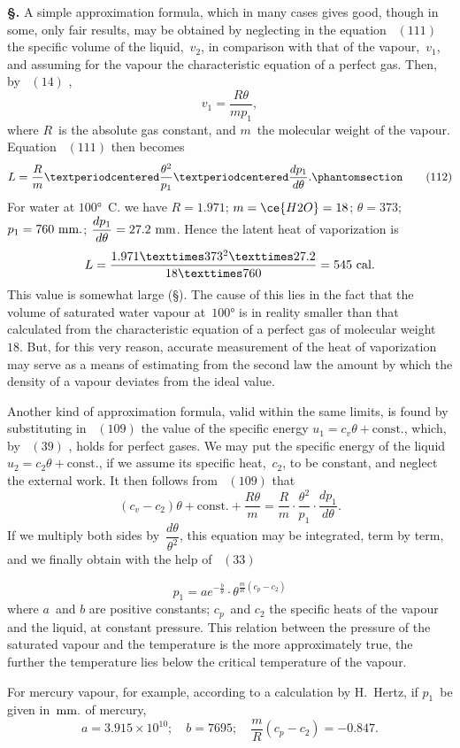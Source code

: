 \documentclass[12pt]{book}[2005/09/16]
\newcommand{\Section}[1]{
  \medskip\par\textbf{§\;#1}
  \label{section:#1}
}
\newcommand{\SecRef}[2][§\;]{\hyperref[section:#2.]{{\upshape #1#2}}}
\newcommand{\Tag}[1]{%
  \phantomsection\label{eqn:#1}\tag*{\ensuremath{#1}}%
}
\newcommand{\Eq}[1]{%
  \hyperref[eqn:#1]{\ensuremath{#1}}%
}
\newcommand{\PageSep}[1]{\ignorespaces}
\newcommand{\const}{\text{const.}}
\newcommand{\efrac}[2]{\tfrac{#1}{#2}}
\newcommand{\Unit}[1]{\text{\upshape #1}}
\begin{document}
\Section{178.} A simple approximation formula, which in many
cases gives good, though in some, only fair results, may be
obtained by neglecting in the equation~\Eq{(111)} the specific
volume of the liquid,~$v_{2}$, in comparison with that of the
vapour,~$v_{1}$, and assuming for the vapour the characteristic
equation of a perfect gas. Then, by~\Eq{(14)},
\[
v_{1} = \frac{R\theta}{mp_{1}},
\]
where $R$~is the absolute gas constant, and $m$~the molecular
weight of the vapour. Equation~\Eq{(111)} then becomes
\[
L = \frac{R}{m} · \frac{\theta^{2}}{p_{1}} · \frac{dp_{1}}{d\theta}.
\Tag{(112)}
\]
For water at $100°$~C. we have $R = 1.971$; $m = \ce{H2O} = 18$;
\PageSep{145}
$\theta = 373$; $p_{1} = 760~\Unit{mm.}$; $\dfrac{dp_{1}}{d\theta} = 27.2~\Unit{mm}$. Hence the
latent heat of vaporization is
\[
L = \frac{1.971 × 373^{2} × 27.2}{18 × 760}
  = 545~\Unit{cal.}
\]
This value is somewhat large (\SecRef{175}). The cause of this
lies in the fact that the volume of saturated water vapour
at~$100°$ is in reality smaller than that calculated from the
characteristic equation of a perfect gas of molecular weight~$18$.
But, for this very reason, accurate measurement of the
heat of vaporization may serve as a means of estimating
from the second law the amount by which the density of a
vapour deviates from the ideal value.

Another kind of approximation formula, valid within the
same limits, is found by substituting in~\Eq{(109)} the value of
the specific energy $u_{1} = c_{v} \theta + \const$, which, by~\Eq{(39)}, holds
for perfect gases. We may put the specific energy of the
liquid $u_{2} = c_{2} \theta + \const$, if we assume its specific heat,~$c_{2}$, to
be constant, and neglect the external work. It then follows
from~\Eq{(109)} that
\[
(c_{v} - c_{2}) \theta + \const + \frac{R \theta}{m}
  = \frac{R}{m} · \frac{\theta^{2}}{p_{1}} · \frac{dp_{1}}{d\theta}.
\]
If we multiply both sides by~$\dfrac{d\theta}{\theta^{2}}$, this equation may be
integrated, term by term, and we finally obtain with the
help of~\Eq{(33)}
\[
p_{1} = ae^{-\efrac{b}{\theta}} · \theta^{\efrac{m}{R} (c_{p} - c_{2})}
\]
where $a$~and $b$ are positive constants; $c_{p}$~and $c_{2}$ the specific
heats of the vapour and the liquid, at constant pressure. This
relation between the pressure of the saturated vapour and
the temperature is the more approximately true, the further
the temperature lies below the critical temperature of the
vapour.
\PageSep{146}

For mercury vapour, for example, according to a calculation
%
by H.~Hertz, if $p_{1}$~be given in~$\Unit{mm.}$ of mercury,
\[
a = 3.915 × 10^{10};\quad
b = 7695;\quad
\frac{m}{R} (c_{p} - c_{2}) = - 0.847.
\]
\end{document}
